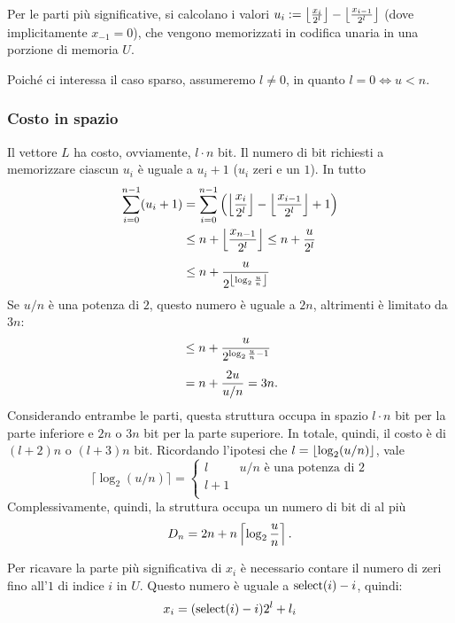 Per le parti più significative, si calcolano i valori $u_i:=\left\lfloor \frac{x_i}{2^l} \right\rfloor-\left\lfloor \frac{x_{i-1}}{2^l} \right\rfloor$ (dove implicitamente $x_{-1}=0$), che vengono memorizzati in codifica unaria in una porzione di memoria $U$.

Poiché ci interessa il caso sparso, assumeremo $l\neq 0$, in quanto $l=0 \iff u<n$.


\subsubsection{Costo in spazio}
Il vettore $L$ ha costo, ovviamente, $l\cdot n$ bit.
Il numero di bit richiesti a memorizzare ciascun $u_i$ è uguale a $u_i+1$ ($u_i$ zeri e un $1$). In tutto
\begin{align*}
	\sum_{i=0}^{n-1}(u_i+1) & = \sum_{i=0}^{n-1}\left(\left\lfloor \frac{x_i}{2^l} \right\rfloor-\left\lfloor \frac{x_{i-1}}{2^l} \right\rfloor+1\right) \\
	                        & \leq n + \left\lfloor \frac{x_{n-1}}{2^l} \right\rfloor \leq n + \frac{u}{2^l}                          \\[1ex]
	                        & \leq n+\frac{u}{2^{\left\lfloor \log_2\frac{u}{n} \right\rfloor}}
\end{align*}
Se $u/n$ è una potenza di $2$, questo numero è uguale a $2n$, altrimenti è limitato da $3n$:
\begin{align*}
	 & \leq n+\frac{u}{2^{\log_2\frac{u}{n}-1}} \\[1ex]
	 & = n+\frac{2u}{u/n} = 3n \text.
\end{align*}
Considerando entrambe le parti, questa struttura occupa in spazio $l\cdot n$ bit per la parte inferiore e $2n$ o $3n$ bit per la parte superiore.
In totale, quindi, il costo è di $(l+2)n$ o $(l+3)n$ bit.
Ricordando l'ipotesi che $l=\left\lfloor \log_2(u/n) \right\rfloor$, vale
\begin{equation*}
	\lceil \log_2(u/n) \rceil =
	\begin{cases}
		l & u/n \text{ è una potenza di } 2 \\
		l +1                                \\
	\end{cases}
\end{equation*}
Complessivamente, quindi, la struttura occupa un numero di bit di al più
\begin{equation*}
	D_n = 2n+n\left\lceil \log_2\frac un \right\rceil \text.
\end{equation*}


Per ricavare la parte più significativa di $x_i$ è necessario contare il numero di zeri fino all'$1$ di indice $i$ in $U$. Questo numero è uguale a $\mathrm{select}(i)-i$, quindi:
\begin{equation*}
	x_i=(\mathrm{select}(i)-i)2^l+l_i
\end{equation*}

